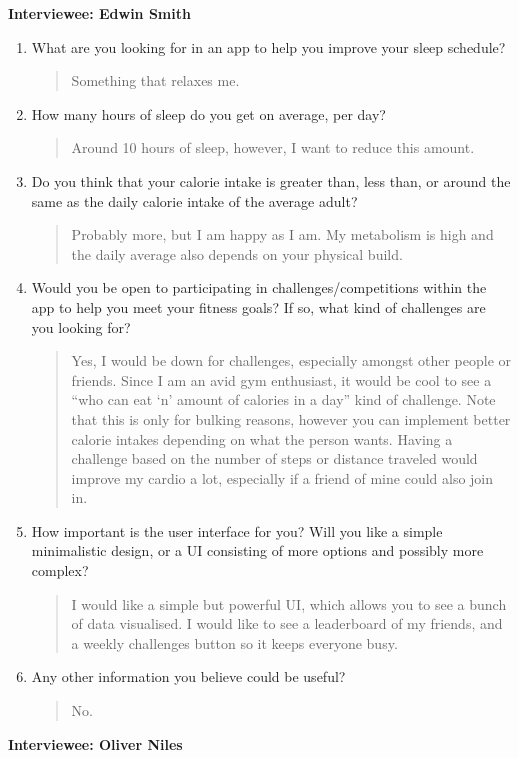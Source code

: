 \documentclass[11pt]{article}
\begin{document}
\textbf{Interviewee: Edwin Smith}

\begin{enumerate}[label=\textbf{Q\arabic*:}, leftmargin=*, align=left]
    \item What are you looking for in an app to help you improve your sleep schedule?
    \begin{quote}
        Something that relaxes me.
    \end{quote}

    \item How many hours of sleep do you get on average, per day?
    \begin{quote}
        Around 10 hours of sleep, however, I want to reduce this amount.
    \end{quote}

    \item Do you think that your calorie intake is greater than, less than, or around the same as the daily calorie intake of the average adult?
    \begin{quote}
        Probably more, but I am happy as I am. My metabolism is high and the daily average also depends on your physical build.
    \end{quote}

    \item Would you be open to participating in challenges/competitions within the app to help you meet your fitness goals? If so, what kind of challenges are you looking for?
    \begin{quote}
        Yes, I would be down for challenges, especially amongst other people or friends. Since I am an avid gym enthusiast, it would be cool to see a “who can eat ‘n’ amount of calories in a day” kind of challenge. Note that this is only for bulking reasons, however you can implement better calorie intakes depending on what the person wants. Having a challenge based on the number of steps or distance traveled would improve my cardio a lot, especially if a friend of mine could also join in.
    \end{quote}

    \item How important is the user interface for you? Will you like a simple minimalistic design, or a UI consisting of more options and possibly more complex?
    \begin{quote}
        I would like a simple but powerful UI, which allows you to see a bunch of data visualised. I would like to see a leaderboard of my friends, and a weekly challenges button so it keeps everyone busy.
    \end{quote}

    \item Any other information you believe could be useful?
    \begin{quote}
        No.
    \end{quote}
\end{enumerate}
\newpage
\textbf{Interviewee: Oliver Niles}
\end{document}
